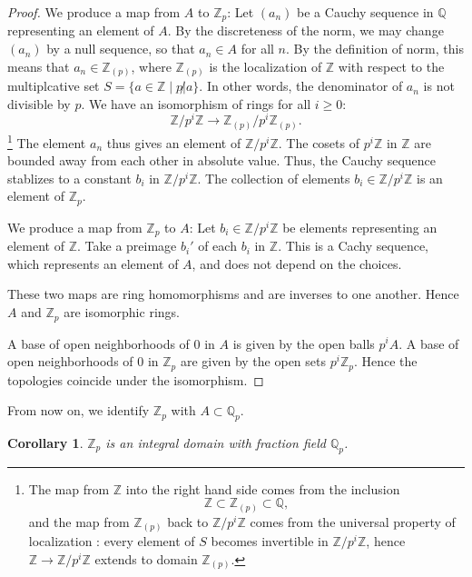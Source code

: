 \documentclass{amsart}
\newcommand{\ring}[1]{\mathbb{#1}}
\newtheorem{corollary}[equation]{Corollary}
\begin{document}
\begin{proof}
  We produce a map from $A$ to $\ring{Z}_p$: Let $(a_n)$ be a Cauchy
  sequence in $\ring{Q}$ representing an element of $A$.  By the
  discreteness of the norm, we may change $(a_n)$ by a null sequence,
  so that $a_n\in A$ for all $n$.  By the definition of norm, this
  means that $a_n \in \ring{Z}_{(p)}$, where $\ring{Z}_{(p)}$ is the
  localization of $\ring{Z}$ with respect to the multiplcative set $S
  = \{a\in\ring{Z}\mid p \not| a\}$.  In other words, the denominator
  of $a_n$ is not divisible by $p$.  We have an isomorphism of rings
  for all $i\ge0$:
\[
\ring{Z}/p^i\ring{Z} \to \ring{Z}_{(p)}/p^i\ring{Z}_{(p)}.
\]
\footnote{The map from $\ring{Z}$ into the right hand side comes from the inclusion
\[
\ring{Z}\subset\ring{Z}_{(p)}\subset \ring{Q},
\]
and the map from $\ring{Z}_{(p)}$ back to $\ring{Z}/p^i\ring{Z}$ comes
from the universal property of localization \cite[8.46]{knapp-basic}: 
every element of $S$
becomes invertible in $\ring{Z}/p^i\ring{Z}$, hence
$\ring{Z}\to\ring{Z}/p^i\ring{Z}$ extends to domain $\ring{Z}_{(p)}$.}
The element $a_n$ thus gives an element of $\ring{Z}/p^i\ring{Z}$.
The cosets of $p^i\ring{Z}$ in $\ring{Z}$ are bounded away from each
other in absolute value.  Thus, the Cauchy sequence stablizes to
a constant $b_i$ in $\ring{Z}/p^i\ring{Z}$.  The collection of
elements $b_i\in\ring{Z}/p^i\ring{Z}$ is an element of $\ring{Z}_p$.

We produce a map from $\ring{Z}_p$ to $A$: Let
$b_i\in\ring{Z}/p^i\ring{Z}$ be elements representing an element of
$\ring{Z}$.  Take a preimage $b_i'$ of each $b_i$ in $\ring{Z}$.  This
is a Cachy sequence, which represents an element of $A$, and does not
depend on the choices.

These two maps are ring homomorphisms and are inverses to one another.
Hence $A$ and $\ring{Z}_p$ are isomorphic rings.

A base of open neighborhoods of $0$ in $A$ is given by the open balls
$p^i A$.  A base of open neighborhoods of $0$ in $\ring{Z}_p$ are
given by the open sets $p^i\ring{Z}_p$.  Hence the topologies coincide
under the isomorphism.
\end{proof}

From now on, we identify $\ring{Z}_p$ with $A\subset\ring{Q}_p$.

\begin{corollary} $\ring{Z}_p$ is an integral domain with fraction field $\ring{Q}_p$.
\end{corollary}
\end{document}

